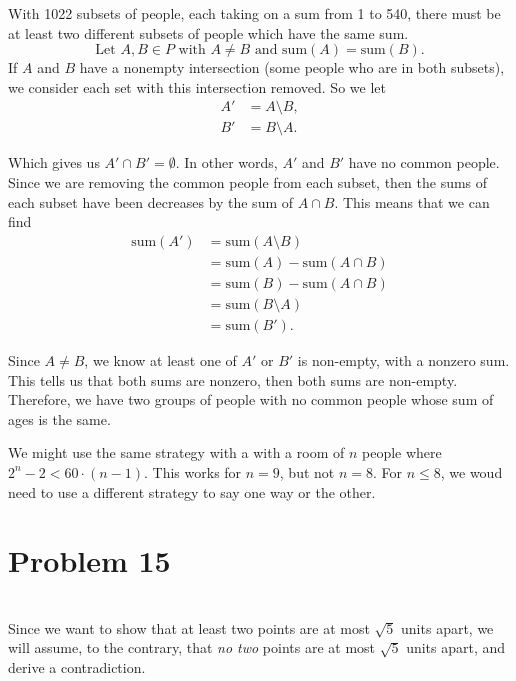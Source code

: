 \documentclass[12pt]{article}
\begin{document}
With 1022 subsets of people, each taking on a sum from 1 to 540, there must be at least two different subsets of people which have the same sum.
\[\text{Let } A,B\in P \text{ with } A\ne B \text{ and sum}(A)=\text{sum}(B).\]
If $A$ and $B$ have a nonempty intersection (some people who are in both subsets), we consider each set with this intersection removed. So we let
\begin{align*}
    A' &= A\setminus B, \\
    B' &= B\setminus A.
\end{align*}

Which gives us $A'\cap B' = \emptyset$. In other words, $A'$ and $B'$ have no common people. Since we are removing the common people from each subset, then the sums of each subset have been decreases by the sum of $A\cap B$. This means that we can find
\begin{align*}
    \text{sum}(A') &= \text{sum}(A\setminus B) \\
                    &= \text{sum}(A) - \text{sum}(A\cap B) \\
                    &= \text{sum}(B) - \text{sum}(A\cap B) \\
                    &= \text{sum}(B\setminus A) \\
                    &= \text{sum}(B').
\end{align*}

Since $A\ne B$, we know at least one of $A'$ or $B'$ is non-empty, with a nonzero sum. This tells us that both sums are nonzero, then both sums are non-empty. Therefore, we have two groups of people with no common people whose sum of ages is the same.

We might use the same strategy with a with a room of $n$ people where $2^n-2<60\cdot(n-1)$. This works for $n=9$, but not $n=8$. For $n\leq 8$, we woud need to use a different strategy to say one way or the other.




\newpage
\section*{Problem 15}
\\

Since we want to show that at least two points are at most $\sqrt{5}$ units apart, we will assume, to the contrary, that \emph{no two} points are at most $\sqrt{5}$ units apart, and derive a contradiction.
\end{document}
